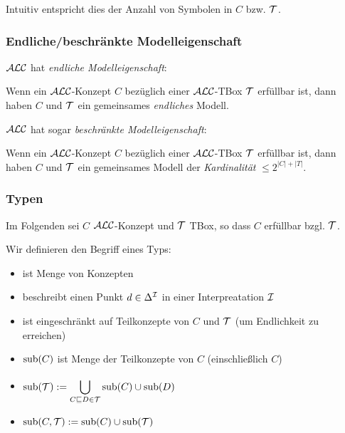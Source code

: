 Intuitiv entspricht dies der Anzahl von Symbolen in $C$ bzw. $\mathcal{T}$.

\subsubsection{Endliche/beschränkte Modelleigenschaft}

$\mathcal{A}\mathcal{L}\mathcal{C}$ hat \emph{endliche Modelleigenschaft}:

\begin{theorem}
Wenn ein $\mathcal{A}\mathcal{L}\mathcal{C}$-Konzept $C$ bezüglich einer $\mathcal{A}\mathcal{L}\mathcal{C}$-TBox $\mathcal{T}$ erfüllbar ist, dann haben $C$ und $\mathcal{T}$ ein gemeinsames \emph{endliches} Modell.
\end{theorem}

$\mathcal{A}\mathcal{L}\mathcal{C}$ hat sogar \emph{beschränkte Modelleigenschaft}:

\begin{theorem}
Wenn ein $\mathcal{A}\mathcal{L}\mathcal{C}$-Konzept $C$ bezüglich einer $\mathcal{A}\mathcal{L}\mathcal{C}$-TBox $\mathcal{T}$ erfüllbar ist, dann haben $C$ und $\mathcal{T}$ ein gemeinsames Modell der \emph{Kardinalität} $\leq 2^{|C|+|T|}$.
\end{theorem}

\subsubsection{Typen}
\label{sec:typ}

Im Folgenden sei $C$ $\mathcal{A}\mathcal{L}\mathcal{C}$-Konzept und $\mathcal{T}$ TBox, so dass $C$ erfüllbar bzgl. $\mathcal{T}$.

Wir definieren den Begriff eines Typs:

\begin{itemize}
  \item ist Menge von Konzepten
  \item beschreibt einen Punkt $d \in \Delta^{\mathcal{I}}$ in einer Interpreatation $\mathcal{I}$
  \item ist eingeschränkt auf Teilkonzepte von $C$ und $\mathcal{T}$ (um Endlichkeit zu erreichen)
\end{itemize}

\begin{definition}[Teilkonzepte]\mbox{}

\begin{itemize}
\item
  $\sub\left( C \right)$ ist Menge der Teilkonzepte von $C$
  (einschließlich $C$)
\item
  $\displaystyle \sub\left( \MT \right) := \bigcup_{C \sqsubseteq D \in \MT}^{}{\sub\left( C \right) \cup \sub\left( D \right)}$
\item
  $\sub\left( C,\MT \right) := \sub\left( C \right) \cup \sub\left( \MT \right)$
\end{itemize}
\end{definition}

